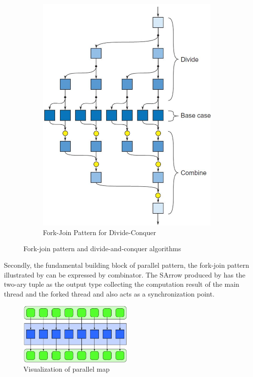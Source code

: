 \begin{figure}[ht]
\begin{subfigure}[b]{0.475\textwidth}
        \includegraphics[width=\textwidth]{arrow/dq.png}
        \caption{Fork-Join Pattern for Divide-Conquer \cite{mccoolStructuredParallelPrograming2012}}
        \label{SArrow:fig:dq}
    \end{subfigure}
    \caption{Fork-join pattern and divide-and-conquer algorithms}
\end{figure}
Secondly, the fundamental building block of parallel pattern, the fork-join pattern illustrated by  can be expressed by \hask{&&&} combinator. The SArrow produced by \hask{&&&} has the two-ary tuple as the output type collecting the computation result of the main thread and the forked thread and also acts as a synchronization point.
\begin{figure}[ht]
    \centering
    \includegraphics[width=0.5\textwidth]{arrow/pmap.png} 
    \caption{Visualization of parallel map \cite{mccoolStructuredParallelPrograming2012}}
    \label{arrow:fig:pmap}
\end{figure}
